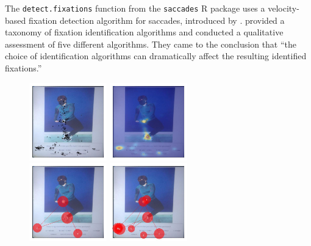 \documentclass[11pt]{asaproc}
\begin{document}
The  {\tt detect.fixations} function from the {\tt saccades} R package
uses a velocity-based fixation detection algorithm for saccades, introduced by \cite{EK2003}.
\cite{SG2000} provided a taxonomy of fixation identification algorithms and conducted
a qualitative assessment of five different algorithms. They came to the conclusion that
``the choice of identification algorithms can dramatically
affect the resulting identified fixations.''


\begin{figure}[t]
\begin{center} 
\includegraphics[width=0.30\textwidth]{figures/Subject13_scatterplot_posture8.jpg} \hspace{1pt}
\includegraphics[width=0.30\textwidth]{figures/Subject13_heatmap_posture8_new.jpg} \\
\includegraphics[width=0.30\textwidth]{figures/Subject13_scanpath_posture8_lambda_1.jpg} \hspace{1pt}
\includegraphics[width=0.30\textwidth]{figures/Subject13_scanpath_posture8_lambda_2.jpg} \\

\end{center}
\end{figure}
\end{document}
